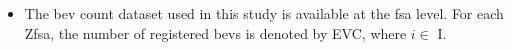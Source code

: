 \begin{itemize}
\item The \gls{bev} count dataset used in this study is available at the \gls{fsa} level. For each \gls{Zfsa}, the number of registered \glspl{bev} is denoted by \gls{EVC}, where $i \in$ \gls{I}.




\end{itemize}


